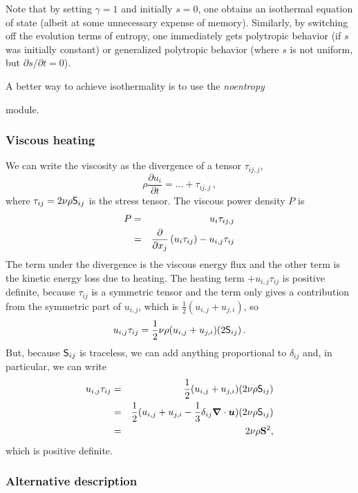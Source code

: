 \documentclass[\mydriver,12pt,twoside,notitlepage,a4paper]{article}
\makeatletter
\newcommand{\name}[2][]{%
  \def\index@{#1}%
  \textsl{#2\/}%
  \ifx\index@\@empty\index{#2@\MakeUppercase #2}%
  \else\index{#1}%
  \fi%
}
\renewcommand{\vec}[1]{\mbox{\boldmath{$#1$}}}
\newcommand{\nab}{\mbox{\boldmath $\nabla$} {}}
\makeatother
\begin{document}
Note that by setting $\gamma=1$ and initially $s=0$, one obtains an
isothermal equation of state (albeit at some unnecessary expense of
memory).
Similarly, by switching off the evolution terms of entropy, one immediately
gets polytropic behavior (if $s$ was initially constant) or generalized
polytropic behavior
(where $s$ is not uniform, but $\partial s/\partial t = 0$).

A better way to achieve isothermality is to use the \name{noentropy}
module.

\subsubsection{Viscous heating}

We can write the viscosity as the divergence of a tensor $\tau_{ij,j}$,
\begin{equation}
  \rho \frac{\partial u_i}{\partial t} = ...+\tau_{ij,j} \, ,
\end{equation}
where $\tau_{ij}=2\nu\rho{\sf S}_{ij}$ is the stress tensor. The viscous power
density $P$ is
\begin{eqnarray}
  P &=& u_i\tau_{ij,j}\\
    &=& {\partial\over\partial x_j}\left(u_i\tau_{ij}\right) - u_{i,j}\tau_{ij}
\end{eqnarray}
The term under the divergence is the viscous energy flux and the other
term is the kinetic energy loss due to heating.
The heating term $+u_{i,j}\tau_{ij}$ is positive definite, because $\tau_{ij}$ is a symmetric tensor
and the term only gives a contribution from the symmetric part of $u_{i,j}$,    which
is $\frac{1}{2}(u_{i,j}+u_{j,i})$, so
\begin{equation}
  u_{i,j}\tau_{ij}=\frac{1}{2}\nu\rho(u_{i,j}+u_{j,i})(2{\sf S}_{ij}) \, .
\end{equation}
But, because ${\sf S}_{ij}$ is traceless, we can add anything
proportional to $\delta_{ij}$ and, in particular, we can write
\begin{eqnarray}
u_{i,j}\tau_{ij}&=&\frac{1}{2}(u_{i,j}+u_{j,i})(2\nu\rho{\sf S}_{ij})\\
&=&\frac{1}{2}(u_{i,j}+u_{j,i}-\frac{1}{3}\delta_{ij}\nab\cdot\vec{u})(2\nu\rho{\sf         S}_{ij})\\
&=&2\nu\rho\mathbf{S}^2,
\end{eqnarray}
which is positive definite.

\subsubsection{Alternative description}
\end{document}
